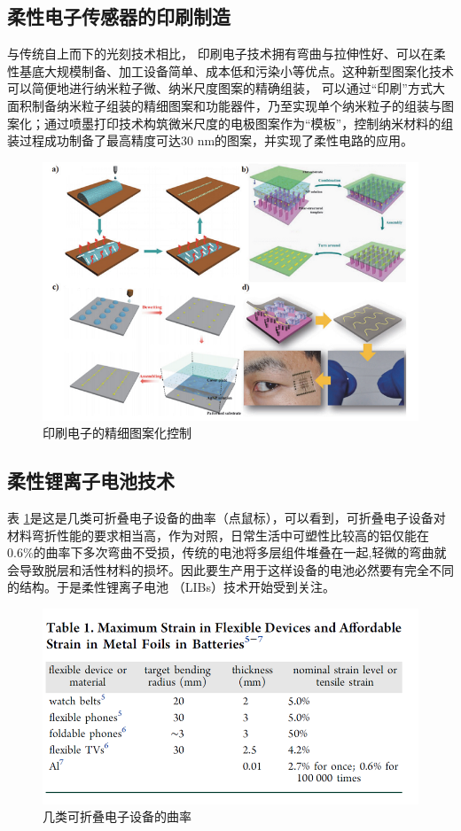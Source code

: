 \documentclass[UTF8,9pt]{ctexart}
\newcommand\sub{\subsection}                                           %
\begin{document}
\sub{柔性电子传感器的印刷制造}
与传统自上而下的光刻技术相比， 印刷电子技术拥有弯曲与拉伸性好、可以在柔性基底大规模制备、加工设备简单、成本低和污染小等优点。这种新型图案化技术可以简便地进行纳米粒子微、纳米尺度图案的精确组装， 可以通过“印刷”方式大面积制备纳米粒子组装的精细图案和功能器件，乃至实现单个纳米粒子的组装与图案化；通过喷墨打印技术构筑微米尺度的电极图案作为“模板”，控制纳米材料的组装过程成功制备了最高精度可达30 nm的图案，并实现了柔性电路的应用。
\begin{figure}[htbp]
    \centering
    \includegraphics[scale=0.4]{14.png}
    \caption{印刷电子的精细图案化控制}
\end{figure}
\sub{柔性锂离子电池技术}
表 \ref{tu}是这是几类可折叠电子设备的曲率（点鼠标），可以看到，可折叠电子设备对材料弯折性能的要求相当高，作为对照，日常生活中可塑性比较高的铝仅能在0.6\%的曲率下多次弯曲不受损，传统的电池将多层组件堆叠在一起,轻微的弯曲就会导致脱层和活性材料的损坏。因此要生产用于这样设备的电池必然要有完全不同的结构。于是柔性锂离子电池 （LIBs）技术开始受到关注。

\begin{figure}[htbp]
    \centering
    \includegraphics[scale=0.7]{15.png}
    \caption{几类可折叠电子设备的曲率}
    \label{tu}
\end{figure}
\end{document}
